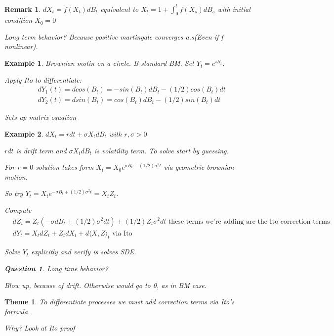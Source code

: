 \documentclass[11pt]{article}
\newtheorem{remark}{Remark}
\newtheorem{quest}{Question}
\newtheorem{theme}{Theme}
\newtheorem{example}{Example}
\begin{document}
\begin{remark}
	$dX_t = f(X_t) dB_t$ equivalent to $X_t = 1 + \int_0^t f(X_s)dB_s$ with initial condition $X_0 = 0$

	Long term behavior?
	Because positive martingale converges a.s(Even if f nonlinear). 
\end{remark}

\begin{example}
	Brownian motin on a circle.
	B standard BM. Set $Y_t = e^{iB_t}$.

	Apply Ito to differentiate:
	\begin{align*}
		&dY_1(t) = dcos(B_t) = -sin(B_t)dB_t - (1/2)cos(B_t)dt\\
		&dY_2(t) = dsin(B_t) = cos(B_t)dB_t - (1/2)sin(B_t)dt
	\end{align*}

	Sets up matrix equation

\end{example}

\begin{example}
	$dX_t = rdt + \sigma X_t dB_t$ with $r,\sigma > 0$

	$rdt$ is drift term and $\sigma X_t dB_t$ is volatility term. To solve start by guessing. 

	For $r = 0$ solution takes form $X_t = X_0 e^{\sigma B_t - (1/2)\sigma^2 t}$ via geometric brownian motion.

	So try $Y_t = X_t e^{-\sigma B_t +(1/2)\sigma^2 t} = X_t Z_t$. 

	Compute
	\begin{align*}
		&dZ_t = Z_t(-\sigma dB_t + (1/2)\sigma^2 dt) + (1/2)Z_t \sigma^2 dt \text{ these terms we're adding are the Ito correction terms}\\
		&dY_t = X_t dZ_t  + Z_t dX_t + d \langle X,Z\rangle_t \text{ via Ito}
	\end{align*}

	Solve $Y_t$ explicitly and verify is solves SDE.

	\begin{quest}
		Long time behavior?
	\end{quest}
	Blow up, because of drift. Otherwise would go to 0, as in BM case.
\end{example}

\begin{theme}
	To differentiate processes we must add correction terms via Ito's formula.

	Why? Look at Ito proof
\end{theme}
\end{document}
